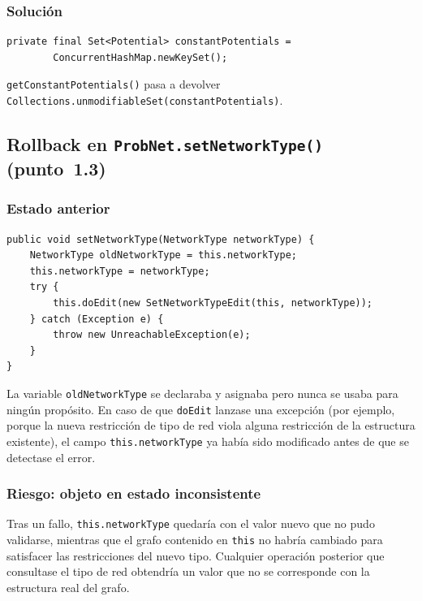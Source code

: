 \documentclass[11pt,a4paper]{article}
\newcommand{\code}[1]{\texttt{#1}}
\begin{document}
\subsubsection*{Solución}

\begin{lstlisting}
private final Set<Potential> constantPotentials =
        ConcurrentHashMap.newKeySet();
\end{lstlisting}

\code{getConstantPotentials()} pasa a devolver
\code{Collections.unmodifiableSet(constantPotentials)}.

\subsection{Rollback en \code{ProbNet.setNetworkType()} (punto~1.3)}

\subsubsection*{Estado anterior}

\begin{lstlisting}
public void setNetworkType(NetworkType networkType) {
    NetworkType oldNetworkType = this.networkType;
    this.networkType = networkType;
    try {
        this.doEdit(new SetNetworkTypeEdit(this, networkType));
    } catch (Exception e) {
        throw new UnreachableException(e);
    }
}
\end{lstlisting}

La variable \code{oldNetworkType} se declaraba y asignaba pero nunca se
usaba para ningún propósito. En caso de que \code{doEdit} lanzase una
excepción (por ejemplo, porque la nueva restricción de tipo de red viola
alguna restricción de la estructura existente), el campo \code{this.networkType}
ya había sido modificado antes de que se detectase el error.

\subsubsection*{Riesgo: objeto en estado inconsistente}

Tras un fallo, \code{this.networkType} quedaría con el valor nuevo que no
pudo validarse, mientras que el grafo contenido en \code{this} no habría
cambiado para satisfacer las restricciones del nuevo tipo. Cualquier
operación posterior que consultase el tipo de red obtendría un valor que
no se corresponde con la estructura real del grafo.
\end{document}
